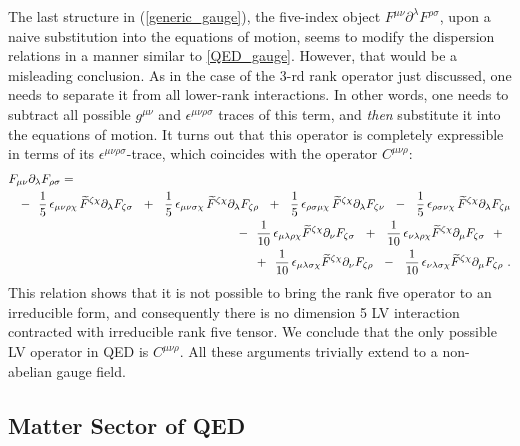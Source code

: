 \documentclass[12pt,preprintnumbers,nofootinbib]{revtex4}
\newcommand{\p}{\partial}
\newcommand{\wt}{\widetilde}
\begin{document}
	The last structure in (\ref{generic_gauge}), the five-index object
$ F^{\mu\nu} \partial^\lambda F^{\rho\sigma} $,
	upon a naive substitution
	into the equations of motion, 
	seems to modify the dispersion relations in a manner similar to \eqref{QED_gauge}.
	However, that would be a misleading conclusion.
	As in the case of the 3-rd rank operator just discussed,
one needs to separate it from all 
	lower-rank interactions.
	In other words, one needs to subtract all possible 
	$ g^{\mu\nu} $ and $ \epsilon^{\mu\nu\rho\sigma} $ 
	traces of this term, and {\it then} substitute it into the
	equations of motion.
	It turns out that this operator is completely expressible
	in terms of its $ \epsilon^{\mu\nu\rho\sigma} $-trace, which
	coincides with the operator $ C^{\mu\nu\rho} $:
\begin{eqnarray*}
\lefteqn{
	F_{\mu\nu} \p_\lambda F_{\rho\sigma} = 
	} &&
	\\
	&&
	-~~ 
	\frac{1}{5}\,\epsilon_{\mu\nu\rho\chi} \,
	\wt{F}^{\zeta\chi}\p_\lambda F_{\zeta\sigma} 
 	~~+~~
	\frac{1}{5}\,\epsilon_{\mu\nu\sigma\chi} \,
	\wt{F}^{\zeta\chi}\p_\lambda F_{\zeta\rho} 
	~~+~~
	\frac{1}{5}\,\epsilon_{\rho\sigma\mu\chi} \,
	\wt{F}^{\zeta\chi}\p_\lambda F_{\zeta\nu} 
 	~~-~~
	\frac{1}{5}\,\epsilon_{\rho\sigma\nu\chi} \,
	\wt{F}^{\zeta\chi}\p_\lambda F_{\zeta\mu}
	\\
	&&
	-~~
	\frac{1}{10}\,\epsilon_{\mu\lambda\rho\chi} 
	\wt{F}^{\zeta\chi}\p_\nu F_{\zeta\sigma} 
	~~+~~
	\frac{1}{10}\,\epsilon_{\nu\lambda\rho\chi} 
	\wt{F}^{\zeta\chi}\p_\mu F_{\zeta\sigma} 
	~~+~~
	\\
	&&
	+~~
	\frac{1}{10}\,\epsilon_{\mu\lambda\sigma\chi} 
	\wt{F}^{\zeta\chi}\p_\nu F_{\zeta\rho} 
	~~-~~
	\frac{1}{10}\,\epsilon_{\nu\lambda\sigma\chi} 
	\wt{F}^{\zeta\chi}\p_\mu F_{\zeta\rho}
	~.
\end{eqnarray*}
	This relation shows that it is not possible to bring the rank five operator
	to an irreducible form,  and consequently there is no dimension 5 LV interaction 
    contracted with irreducible rank five tensor. 
We conclude that the only possible
	LV operator in QED is $ C^{\mu\nu\rho} $.  
	All these arguments trivially extend to a non-abelian gauge
	field.

\subsection{Matter Sector of QED}
\end{document}
